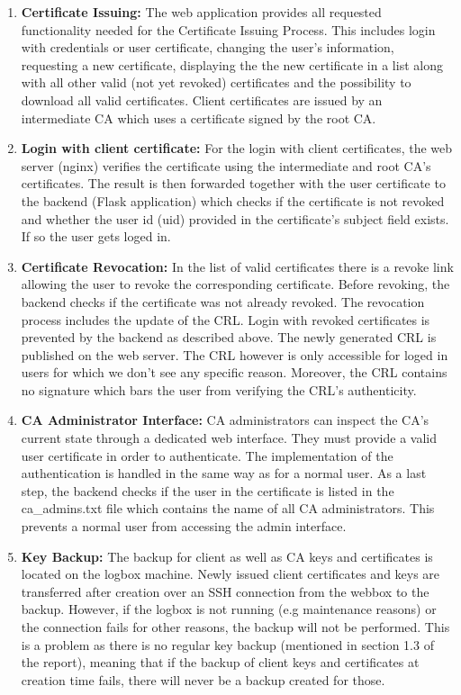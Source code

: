 \documentclass[english]{article}
\begin{document}
\begin{enumerate}

\item \textbf{Certificate Issuing:}
The web application provides all requested functionality needed for the Certificate Issuing Process. This includes login with credentials or user certificate, changing the user's information, requesting a new certificate, displaying the the new certificate in a list along with all other valid (not yet revoked) certificates and the possibility to download all valid certificates. Client certificates are issued by an intermediate CA which uses a certificate signed by the root CA. 

\item \textbf {Login with client certificate:}
For the login with client certificates, the web server (nginx) verifies the certificate using the intermediate and root CA's certificates. The result is then forwarded together with the user certificate to the backend (Flask application) which checks if the certificate is not revoked and whether the user id (uid) provided in the certificate's subject field exists. If so the user gets loged in.

\item \textbf{Certificate Revocation:}
In the list of valid certificates there is a revoke link allowing the user to revoke the corresponding certificate. Before revoking, the backend  checks if the certificate was not already revoked. The revocation process includes the update of the CRL. Login with revoked certificates is prevented by the backend as described above. The newly generated CRL is published on the web server. The CRL however is only accessible for loged in users for which we don't see any specific reason. Moreover, the CRL contains no signature which bars the user from verifying the CRL's authenticity.

\item \textbf{CA Administrator Interface:}
CA administrators can inspect the CA's current state through a dedicated web interface. They must provide a valid user certificate in order to authenticate. The implementation of the authentication is handled in the same way as for a normal user. As a last step, the backend checks if the user in the certificate is listed in the ca\_admins.txt file which contains the name of all CA administrators. This prevents a normal user from accessing the admin interface.

\item \textbf{Key Backup:}
The backup for client as well as CA keys and certificates is located on the logbox machine. Newly issued client certificates and keys are transferred after creation over an SSH connection from the webbox to the backup. However, if the logbox is not running (e.g maintenance reasons) or the connection fails for other reasons, the backup will not be performed. This is a problem as there is no regular key backup (mentioned in section 1.3 of the report),
 meaning that if the backup of client keys and certificates at creation time fails, there will never be a backup created for those. 


\end{enumerate}
\end{document}
